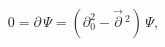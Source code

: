 \begin{equation}\label{43}
 0=\partial\, \Psi = \left(\partial_0^2 - \vec{\partial}\,{}^2\right)\, \Psi,
\end{equation}

